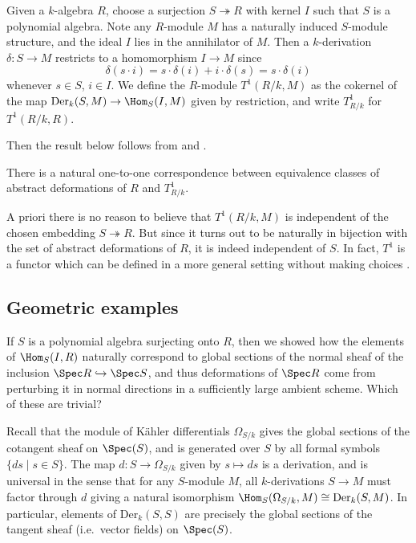 Given a \(k\)-algebra \(R\), choose a surjection \(S\twoheadrightarrow R\) with
kernel \(I\) such that \(S\) is a polynomial algebra. Note any \(R\)-module
\(M\) has a naturally induced \(S\)-module structure, and the ideal \(I\) lies
in the annihilator of \(M\). Then a \(k\)-derivation
\(\delta:S\rightarrow M\) restricts to a homomorphism \(I\rightarrow M\) since 
\[\delta(s\cdot i) = s\cdot \delta(i) + i\cdot \delta(s) = s\cdot \delta(i)\]
whenever \(s\in S\), \(i\in I\). We define the \(R\)-module \(T^1(R/k,M)\) as
the cokernel of the map \(\text{Der}_k(S,M)\to\Hom_{S}(I,M)\) given by
restriction, and write \(T^1_{R/k}\) for \(T^1(R/k,R)\).

Then the result below follows from  and .

\begin{corollary} 
    There is a natural one-to-one correspondence between equivalence
    classes of abstract deformations of $R$ and $T^1_{R/k}$.  
\end{corollary}

\begin{remark}
    A priori there is no reason to believe that \(T^1(R/k,M)\) is independent of
    the chosen embedding \(S\twoheadrightarrow R\). But since it turns out to be
    naturally in bijection with the set of abstract deformations of \(R\), it is
    indeed independent of \(S\). In fact, \(T^1\) is a functor which can be
    defined in a more general setting without making choices \cite[see for
    instance][]{hartshorne_deformation_2010}. 
\end{remark}

\subsection{Geometric examples}
If \(S\) is a polynomial algebra surjecting onto \(R\), then we showed how the
elements of \(\Hom_S(I,R)\) naturally correspond to global sections of the
normal sheaf of the inclusion \(\Spec R \hookrightarrow \Spec S \), and thus
deformations of \(\Spec R\) come from perturbing it in normal directions in a
sufficiently large ambient scheme. Which of these are trivial?  

Recall that the module of K\"ahler differentials \(\Omega_{S/k}\) gives the
global sections of the cotangent sheaf on \(\Spec(S)\), and is generated
over \(S\) by all formal symbols \(\{ds\;|\; s\in S\}\). The map \(d:
S\rightarrow \Omega_{S/k}\) given by \(s\mapsto ds\) is a derivation, and is
universal in the sense that for any \(S\)-module \(M\), all \(k\)-derivations
\(S\rightarrow M\) must factor through \(d\) giving a natural isomorphism
\(\Hom_S(\Omega_{S/k}, M) \cong \text{Der}_k(S,M)\). In particular, elements of 
\(\text{Der}_k(S,S)\) are precisely the global sections of the tangent sheaf
(i.e.\ vector fields) on \(\Spec(S)\).

